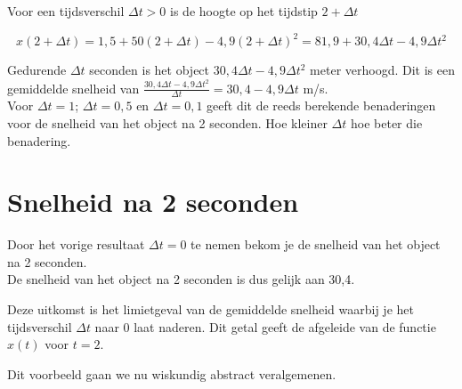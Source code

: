 \documentclass{article}
\begin{document}
Voor een tijdsverschil $\Delta t>0$ is de hoogte op het tijdstip $2+\Delta t$

\[
x(2+\Delta t) = 1,5+50 (2+ \Delta t) - 4,9 (2+ \Delta t)^2 = 81,9+30,4 \Delta t - 4,9 \Delta t^2
\]

\noindent Gedurende $\Delta t$ seconden is het object $30,4 \Delta t -4,9 \Delta t^2$ meter verhoogd.
Dit is een gemiddelde snelheid van $\frac{30,4 \Delta t -4,9 \Delta t^2}{\Delta t}=30,4 -4,9 \Delta t$ m/s.\\

\noindent Voor $\Delta t=1$; $\Delta t=0,5$ en $\Delta t=0,1$ geeft dit de reeds berekende benaderingen voor de snelheid van het object na 2 seconden.
Hoe kleiner $\Delta t$ hoe beter die benadering.

\section{Snelheid na 2 seconden}

Door het vorige resultaat $\Delta t=0$ te nemen bekom je de snelheid van het object na 2 seconden.\\
De snelheid van het object na 2 seconden is dus gelijk aan 30,4.\vspace{0,5 mm}

Deze uitkomst is het limietgeval van de gemiddelde snelheid waarbij je het tijdsverschil $\Delta t$ naar 0 laat naderen.
Dit getal geeft de afgeleide van de functie $x(t)$ voor $t=2$.\vspace{1 cm}

Dit voorbeeld gaan we nu wiskundig abstract veralgemenen.
\end{document}
